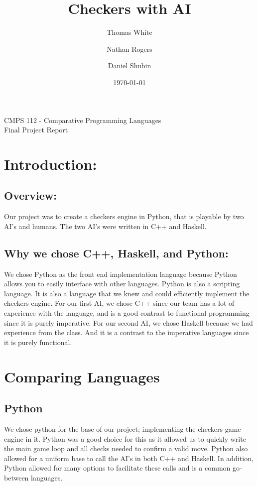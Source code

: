 \documentclass[12pt]{article}
\begin{document}
\begin{titlepage}
\title{\huge \bf Checkers with AI}
\date{\today}
\author{Thomas White \\
    \and Nathan Rogers \\
    \and Daniel Shubin}
\maketitle
\thispagestyle{empty}
\begin{center}
    CMPS 112 - Comparative Programming Languages \\
    Final Project Report
\end{center}
\end{titlepage}

\section{Introduction:}
    \subsection{Overview:}
        Our project was to create a checkers engine in Python,
        that is playable by two AI's and humans. The two AI's
        were written in C++ and Haskell.
    \subsection{Why we chose C++, Haskell, and Python:}
        We chose Python as the front end implementation language
        because Python allows you to easily interface with other
        languages. Python is also a scripting language.
        It is also a language that we knew and could efficiently
        implement the checkers engine.
        For our first AI, we chose C++ since our team has a lot of
        experience with the language, and is a good contrast to functional
        programming since it is purely imperative.
        For our second AI, we chose Haskell because we had experience from
        the class. And it is a contrast to the imperative languages since
        it is purely functional.

\section{Comparing Languages}
    \subsection{Python}
        We chose python for the base of our project; implementing the checkers game engine in it. Python was a good choice for this as it allowed us to quickly write the main game loop and all checks needed to confirm a valid move. Python also allowed for a uniform base to call the AI's in both C++ and Haskell. In addition, Python allowed for many options to facilitate these calls and is a common go-between languages.
\end{document}
